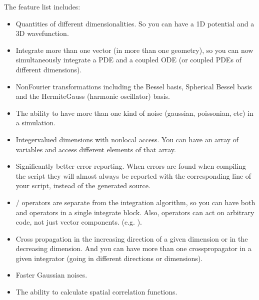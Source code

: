 \documentclass[letterpaper,10pt,english]{sphinxmanual}
\begin{document}
\sphinxAtStartPar
The feature list includes:
\begin{itemize}
\item {} 
\sphinxAtStartPar
Quantities of different dimensionalities. So you can have a 1D potential and a 3D wavefunction.

\item {} 
\sphinxAtStartPar
Integrate more than one vector (in more than one geometry), so you can now simultaneously integrate a PDE and a coupled ODE (or coupled PDEs of different dimensions).

\item {} 
\sphinxAtStartPar
Non\sphinxhyphen{}Fourier transformations including the Bessel basis, Spherical Bessel basis and the Hermite\sphinxhyphen{}Gauss (harmonic oscillator) basis.

\item {} 
\sphinxAtStartPar
The ability to have more than one kind of noise (gaussian, poissonian, etc) in a simulation.

\item {} 
\sphinxAtStartPar
Integer\sphinxhyphen{}valued dimensions with non\sphinxhyphen{}local access. You can have an array of variables and access different elements of that array.

\item {} 
\sphinxAtStartPar
Significantly better error reporting. When errors are found when compiling the script they will almost always be reported with the corresponding line of your script, instead of the generated source.

\item {} 
\sphinxAtStartPar
{}/ operators are separate from the integration algorithm, so you can have both  and  operators in a single integrate block. Also,  operators can act on arbitrary code, not just vector components. (e.g. ).

\item {} 
\sphinxAtStartPar
Cross propagation in the increasing direction of a given dimension or in the decreasing dimension. And you can have more than one cross\sphinxhyphen{}propagator in a given integrator (going in different directions or dimensions).

\item {} 
\sphinxAtStartPar
Faster Gaussian noises.

\item {} 
\sphinxAtStartPar
The ability to calculate spatial correlation functions.


\end{itemize}
\end{document}
